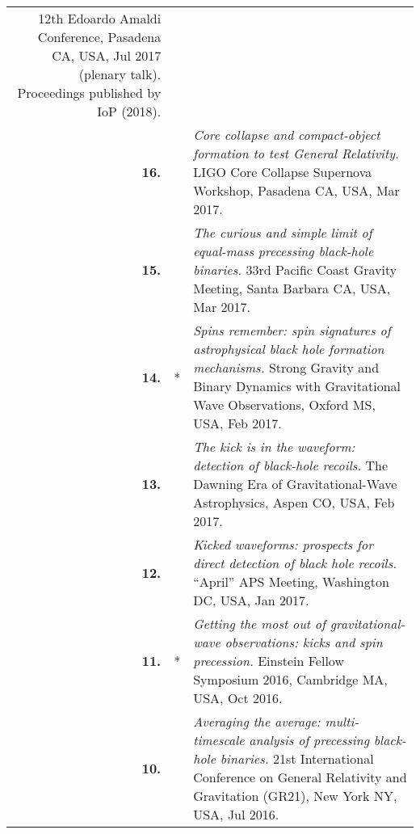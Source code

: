 \documentclass[a4paper]{moderncv}
\begin{document}
{\begin{longtable}{rp{0.4cm}p{15.8cm}}
\newline{}12th Edoardo Amaldi Conference, Pasadena CA, USA, Jul 2017 (plenary talk).
\newline{}Proceedings published by IoP (2018).
\vspace{0.05cm}\\
%
\textbf{16.} & & \textit{Core collapse and compact-object formation to test General Relativity.}
\newline{}LIGO Core Collapse Supernova Workshop, Pasadena CA, USA, Mar 2017.
\vspace{0.05cm}\\
%
\textbf{15.} & & \textit{The curious and simple limit of equal-mass precessing black-hole binaries.}
\newline{}33rd Pacific Coast Gravity Meeting, Santa Barbara CA, USA, Mar 2017.
\vspace{0.05cm}\\
%
\textbf{14.} & * & \textit{Spins remember: spin signatures of astrophysical black hole formation mechanisms.}
\newline{}Strong Gravity and Binary Dynamics with Gravitational Wave Observations, Oxford MS, USA, Feb 2017.
\vspace{0.05cm}\\
%
\textbf{13.} & & \textit{The kick is in the waveform: detection of black-hole recoils.}
\newline{}The Dawning Era of Gravitational-Wave Astrophysics, Aspen CO, USA, Feb 2017.
\vspace{0.05cm}\\
%
\textbf{12.} & & \textit{Kicked waveforms: prospects for direct detection of black hole recoils.}
\newline{}``April'' APS Meeting, Washington DC, USA, Jan 2017.
\vspace{0.05cm}\\
%
\textbf{11.} & * & \textit{Getting the most out of gravitational-wave observations: kicks and spin precession.}
\newline{}Einstein Fellow Symposium 2016, Cambridge MA, USA, Oct 2016.
\vspace{0.05cm}\\
%
\textbf{10.} & & \textit{Averaging the average: multi-timescale analysis of precessing black-hole binaries.}
\newline{}21st International Conference on General Relativity and Gravitation (GR21), New York NY, USA, Jul 2016.
\vspace{0.05cm}\\

\end{longtable}}
\end{document}

